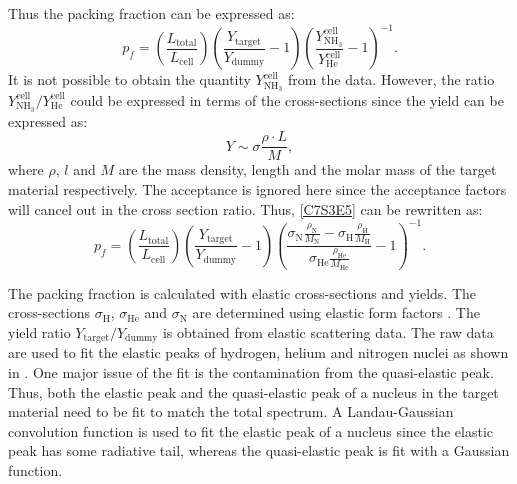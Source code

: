 Thus the packing fraction can be expressed as:
\begin{equation} \label{C7S3E5}
p_f = \left(\frac{L_{\mathrm{total}}}{L_{\mathrm{cell}}}\right)\left(\frac{Y_{\mathrm{target}}}{Y_{\mathrm{dummy}}}-1\right)\left(\frac{Y_{\mathrm{NH_3}}^{\mathrm{cell}}}{Y_{\mathrm{He}}^{\mathrm{cell}}}-1\right)^{-1}.
\end{equation}
It is not possible to obtain the quantity $Y_{\mathrm{NH_3}}^{\mathrm{cell}}$ from the data. However, the ratio $Y_{\mathrm{NH_3}}^{\mathrm{cell}}/Y_{\mathrm{He}}^{\mathrm{cell}}$ could be expressed in terms of the cross-sections since the yield can be expressed as:
\begin{equation} \label{C7S3E6}
Y \sim \sigma\frac{\rho\cdot L}{M},
\end{equation}
where $\rho$, $l$ and $M$ are the mass density, length and the molar mass of the target material respectively. The acceptance is ignored here since the acceptance factors will cancel out in the cross section ratio. Thus, \cref{C7S3E5} can be rewritten as:
\begin{equation} \label{C7S3E7}
p_f = \left(\frac{L_{\mathrm{total}}}{L_{\mathrm{cell}}}\right)\left(\frac{Y_{\mathrm{target}}}{Y_{\mathrm{dummy}}}-1\right)\left(\frac{\sigma_{\mathrm{N}}\frac{\rho_{\mathrm{N}}}{M_{\mathrm{N}}}-\sigma_{\mathrm{H}}\frac{\rho_{\mathrm{H}}}{M_{\mathrm{H}}}}{\sigma_{\mathrm{He}}\frac{\rho_{\mathrm{He}}}{M_{\mathrm{He}}}}-1\right)^{-1}.
\end{equation}

The packing fraction is calculated with elastic cross-sections and yields. The cross-sections $\sigma_{\mathrm{H}}$, $\sigma_{\mathrm{He}}$ and $\sigma_{\mathrm{N}}$ are determined using elastic form factors \cite{Venkat2011,Jager1974}. The yield ratio $Y_{\mathrm{target}}/Y_{\mathrm{dummy}}$ is obtained from elastic scattering data. The raw data are used to fit the elastic peaks of hydrogen, helium and nitrogen nuclei as shown in . One major issue of the fit is the contamination from the quasi-elastic peak. Thus, both the elastic peak and the quasi-elastic peak of a nucleus in the target material need to be fit to match the total spectrum. A Landau-Gaussian convolution function is used to fit the elastic peak of a nucleus since the elastic peak has some radiative tail, whereas the quasi-elastic peak is fit with a Gaussian function.

